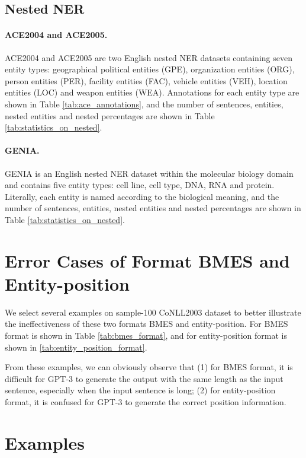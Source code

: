 \documentclass[11pt]{article}
\begin{document}
\subsection{Nested NER}
\label{nested_ner_datasets_details}

\paragraph{ACE2004 and ACE2005.} ACE2004 \cite{doddington2004automatic} and ACE2005 \cite{christopher2006ace} are two English nested NER datasets containing seven entity types: geographical political entities (GPE), organization entities (ORG), person entities (PER), facility entities (FAC), vehicle entities (VEH), location entities (LOC) and weapon entities (WEA). Annotations for each entity type are shown in Table \ref{tab:ace_annotations}, and the number of sentences, entities, nested entities and nested percentages are shown in Table \ref{tab:statistics_on_nested}.

\paragraph{GENIA.} GENIA is an English nested NER dataset within the molecular biology domain and contains five entity types: cell line, cell type, DNA, RNA and protein. Literally, each entity is named according to the biological meaning, and the number of sentences, entities, nested entities and nested percentages are shown in Table \ref{tab:statistics_on_nested}.

\section{Error Cases of Format BMES and Entity-position}
\label{error_format_example}

We select several examples on sample-100 CoNLL2003 dataset to better illustrate the ineffectiveness of these two formats BMES and entity-position. For BMES format is shown in Table \ref{tab:bmes_format}, and for entity-position format is shown in \ref{tab:entity_position_format}.

From these examples, we can obviously observe that (1) for BMES format, it is difficult for GPT-3 to generate the output with the same length as the input sentence, especially when the input sentence is long; (2) for entity-position format, it is confused for GPT-3 to generate the correct position information.

\section{Examples}
\label{demonstrations_examples}
\end{document}
